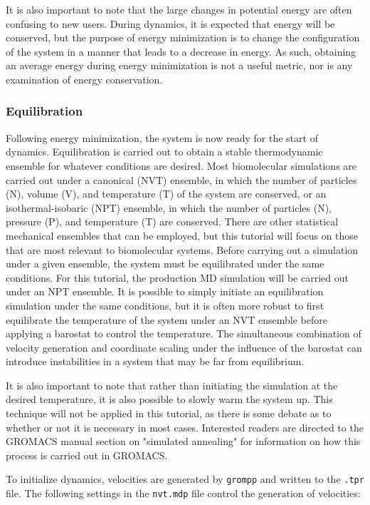 \documentclass[9pt,tutorial]{livecoms}
\begin{document}
It is also important to note that the large changes in potential energy are often confusing to new users. During dynamics, it is expected that energy will be conserved, but the purpose of energy minimization is to change the configuration of the system in a manner that leads to a decrease in energy. As such, obtaining an average energy during energy minimization is not a useful metric, nor is any examination of energy conservation.

\subsubsection{Equilibration} \label{lyso_equil}

Following energy minimization, the system is now ready for the start of dynamics. Equilibration is carried out to obtain a stable thermodynamic ensemble for whatever conditions are desired. Most biomolecular simulations are carried out under a canonical (NVT) ensemble, in which the number of particles (N), volume (V), and temperature (T) of the system are conserved, or an isothermal-isobaric (NPT) ensemble, in which the number of particles (N), pressure (P), and temperature (T) are conserved. There are other statistical mechanical ensembles that can be employed, but this tutorial will focus on those that are most relevant to biomolecular systems. Before carrying out a simulation under a given ensemble, the system must be equilibrated under the same conditions. For this tutorial, the production MD simulation will be carried out under an NPT ensemble. It is possible to simply initiate an equilibration simulation under the same conditions, but it is often more robust to first equilibrate the temperature of the system under an NVT ensemble before applying a barostat to control the temperature. The simultaneous combination of velocity generation and coordinate scaling under the influence of the barostat can introduce instabilities in a system that may be far from equilibrium.

It is also important to note that rather than initiating the simulation at the desired temperature, it is also possible to slowly warm the system up. This technique will not be applied in this tutorial, as there is some debate as to whether or not it is necessary in most cases. Interested readers are directed to the GROMACS manual section on "simulated annealing" for information on how this process is carried out in GROMACS.

To initialize dynamics, velocities are generated by \texttt{grompp} and written to the \texttt{.tpr} file. The following settings in the \texttt{nvt.mdp} file control the generation of velocities:
\end{document}
